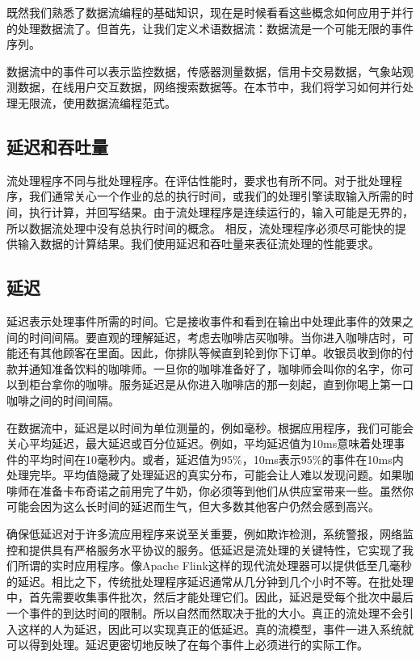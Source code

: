 \documentclass[cn,11pt,chinese]{elegantbook}
\begin{document}
既然我们熟悉了数据流编程的基础知识，现在是时候看看这些概念如何应用于并行的处理数据流了。但首先，让我们定义术语数据流：数据流是一个可能无限的事件序列。

数据流中的事件可以表示监控数据，传感器测量数据，信用卡交易数据，气象站观测数据，在线用户交互数据，网络搜索数据等。在本节中，我们将学习如何并行处理无限流，使用数据流编程范式。

\hypertarget{ux5ef6ux8fdfux548cux541eux5410ux91cf}{%
\subsection{延迟和吞吐量}\label{ux5ef6ux8fdfux548cux541eux5410ux91cf}}

流处理程序不同与批处理程序。在评估性能时，要求也有所不同。对于批处理程序，我们通常关心一个作业的总的执行时间，或我们的处理引擎读取输入所需的时间，执行计算，并回写结果。由于流处理程序是连续运行的，输入可能是无界的，所以数据流处理中没有总执行时间的概念。
相反，流处理程序必须尽可能快的提供输入数据的计算结果。我们使用延迟和吞吐量来表征流处理的性能要求。

\hypertarget{ux5ef6ux8fdf}{%
\subsection{延迟}\label{ux5ef6ux8fdf}}

延迟表示处理事件所需的时间。它是接收事件和看到在输出中处理此事件的效果之间的时间间隔。要直观的理解延迟，考虑去咖啡店买咖啡。当你进入咖啡店时，可能还有其他顾客在里面。因此，你排队等候直到轮到你下订单。收银员收到你的付款并通知准备饮料的咖啡师。一旦你的咖啡准备好了，咖啡师会叫你的名字，你可以到柜台拿你的咖啡。服务延迟是从你进入咖啡店的那一刻起，直到你喝上第一口咖啡之间的时间间隔。

在数据流中，延迟是以时间为单位测量的，例如毫秒。根据应用程序，我们可能会关心平均延迟，最大延迟或百分位延迟。例如，平均延迟值为10ms意味着处理事件的平均时间在10毫秒内。或者，延迟值为95\%，10ms表示95\%的事件在10ms内处理完毕。平均值隐藏了处理延迟的真实分布，可能会让人难以发现问题。如果咖啡师在准备卡布奇诺之前用完了牛奶，你必须等到他们从供应室带来一些。虽然你可能会因为这么长时间的延迟而生气，但大多数其他客户仍然会感到高兴。

确保低延迟对于许多流应用程序来说至关重要，例如欺诈检测，系统警报，网络监控和提供具有严格服务水平协议的服务。低延迟是流处理的关键特性，它实现了我们所谓的实时应用程序。像Apache
Flink这样的现代流处理器可以提供低至几毫秒的延迟。相比之下，传统批处理程序延迟通常从几分钟到几个小时不等。在批处理中，首先需要收集事件批次，然后才能处理它们。因此，延迟是受每个批次中最后一个事件的到达时间的限制。所以自然而然取决于批的大小。真正的流处理不会引入这样的人为延迟，因此可以实现真正的低延迟。真的流模型，事件一进入系统就可以得到处理。延迟更密切地反映了在每个事件上必须进行的实际工作。
\end{document}
